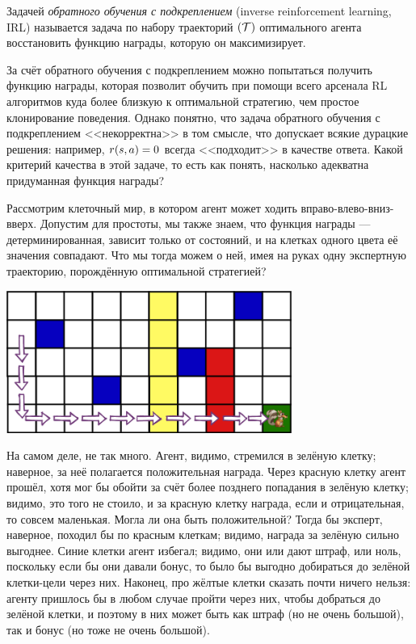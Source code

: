 \begin{definition}
Задачей \emph{обратного обучения с подкреплением} (inverse reinforcement learning, IRL) называется задача по набору траекторий $(\mathcal{T})$ оптимального агента восстановить функцию награды, которую он максимизирует.
\end{definition}

За счёт обратного обучения с подкреплением можно попытаться получить функцию награды, которая позволит обучить при помощи всего арсенала RL алгоритмов куда более близкую к оптимальной стратегию, чем простое клонирование поведения. Однако понятно, что задача обратного обучения с подкреплением <<некорректна>> в том смысле, что допускает всякие дурацкие решения: например, $r(s, a) \HM= 0$ всегда <<подходит>> в качестве ответа. Какой критерий качества в этой задаче, то есть как понять, насколько адекватна придуманная функция награды?

\begin{example}
Рассмотрим клеточный мир, в котором агент может ходить вправо-влево-вниз-вверх. Допустим для простоты, мы также знаем, что функция награды --- детерминированная, зависит только от состояний, и на клетках одного цвета её значения совпадают. Что мы тогда можем о ней, имея на руках одну экспертную траекторию, порождённую оптимальной стратегией?
\begin{center}
    \includegraphics[width=0.7\textwidth]{Images/IRL.png}
\end{center}
На самом деле, не так много. Агент, видимо, стремился в зелёную клетку; наверное, за неё полагается положительная награда. Через красную клетку агент прошёл, хотя мог бы обойти за счёт более позднего попадания в зелёную клетку; видимо, это того не стоило, и за красную клетку награда, если и отрицательная, то совсем маленькая. Могла ли она быть положительной? Тогда бы эксперт, наверное, походил бы по красным клеткам; видимо, награда за зелёную сильно выгоднее. Синие клетки агент избегал; видимо, они или дают штраф, или ноль, поскольку если бы они давали бонус, то было бы выгодно добираться до зелёной клетки-цели через них. Наконец, про жёлтые клетки сказать почти ничего нельзя: агенту пришлось бы в любом случае пройти через них, чтобы добраться до зелёной клетки, и поэтому в них может быть как штраф (но не очень большой), так и бонус (но тоже не очень большой).
\end{example}

